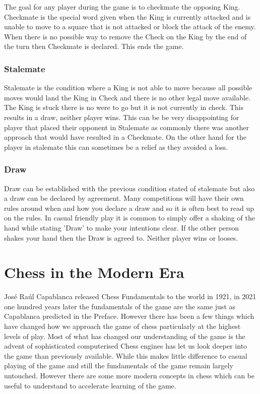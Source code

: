 \documentclass[11pt,a4paper]{book}
\begin{document}
The goal for any player during the game is to checkmate the opposing King. Checkmate is the special word given when the King is currently attacked and is unable to move to a square that is not attacked or block the attack of the enemy.
When  there is no possible way to remove the Check on the King by the end of the turn then Checkmate is declared. This ends the game.
 
\subsection*{Stalemate}

Stalemate is the condition where a King is not able to move because all possible moves would land the King in Check and there is no other legal move available. The King is stuck there is no were to go but it is not currently in check. This results in a draw, neither player wins. This can be be very disappointing for player that placed their opponent in Stalemate as commonly there was another approach that would have resulted in a Checkmate. On the other hand for the player in stalemate this can sometimes be a relief as they avoided a loss.

\subsection*{Draw}

Draw can be established with the previous condition stated of stalemate but also a draw can be declared by agreement. Many competitions will have their own rules around when and how you declare a draw and so it is often best to read up on the rules. In casual friendly play it is common to simply offer a shaking of the hand while stating 'Draw' to make your intentions clear. If the other person shakes your hand then the Draw is agreed to. Neither player wins or looses.

\chapter{Chess in the Modern Era}

José Raúl Capablanca released Chess Fundamentals to the world in 1921, in 2021 one hundred years later the fundamentals of the game are the same just as Capablanca predicted in the Preface. However there has been a few things which have changed how we approach the game of chess particularly at the highest levels of play. Most of what has changed our understanding of the game is the advent of sophisticated computerised Chess engines has let us look deeper into the game than previously available. While this makes little difference to casual playing of the game and still the fundamentals of the game remain largely untouched. However there are some more modern concepts in chess which can be useful to understand to accelerate learning of the game.
\end{document}
